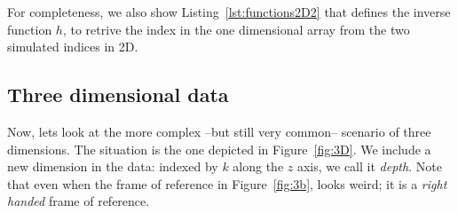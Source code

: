 
For completeness, we also show Listing~\ref{lst:functions2D2} that defines the inverse function $h$, to retrive the index in the one dimensional array from the two simulated indices in 2D.


\subsection{Three dimensional data}

Now, lets look at the more complex --but still very common-- scenario of three dimensions.
The situation is the one depicted in Figure~\ref{fig:3D}.
We include a new dimension in the data: indexed by $k$ along the $z$ axis, we call it \emph{depth}.
Note that even when the frame of reference in Figure~\ref{fig:3b}, looks weird; it is a \emph{right handed} frame of reference. 

